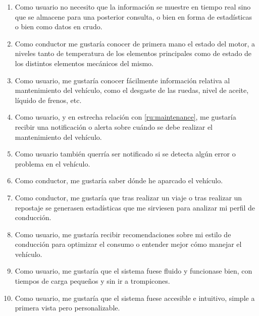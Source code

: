 \begin{enumerate}[label=\textbf{\texttt{RU-\arabic*}}]
  \item\label{ru:rt} Como usuario no necesito que la información se muestre en tiempo
        real sino que se almacene para una posterior consulta, o bien en forma de
        estadísticas o bien como datos en crudo.
  \item\label{ru:status} Como conductor me gustaría conocer de primera mano el estado
        del motor, a niveles tanto de temperatura de los elementos principales como
        de estado de los distintos elementos mecánicos del mismo.
  \item\label{ru:maintenance} Como usuario, me gustaría conocer fácilmente
        información relativa al mantenimiento del vehículo, como el desgaste de
        las ruedas, nivel de aceite, líquido de frenos, etc.
  \item\label{ru:notifications} Como usuario, y en estrecha relación con
        \ref{ru:maintenance}, me gustaría recibir una notificación o alerta sobre
        cuándo se debe realizar el mantenimiento del vehículo. 
  \item\label{ru:err-notifications} Como usuario también querría ser notificado si se detecta algún error o problema
        en el vehículo.
  \item\label{ru:parking} Como conductor, me gustaría saber dónde he aparcado el
        vehículo.
  \item\label{ru:stats} Como conductor, me gustaría que tras realizar un viaje
        o tras realizar un repostaje se generasen estadísticas que me sirviesen para
        analizar mi perfil de conducción.
  \item\label{ru:recommendations} Como usuario, me gustaría recibir recomendaciones
        sobre mi estilo de conducción para optimizar el consumo o entender mejor cómo
        manejar el vehículo.
  \item\label{ru:speed} Como usuario, me gustaría que el sistema fuese fluido y
        funcionase bien, con tiempos de carga pequeños y sin ir a trompicones.
  \item\label{ru:intuitive} Como usuario, me gustaría que el sistema fuese accesible
        e intuitivo, simple a primera vista pero personalizable.
\end{enumerate}